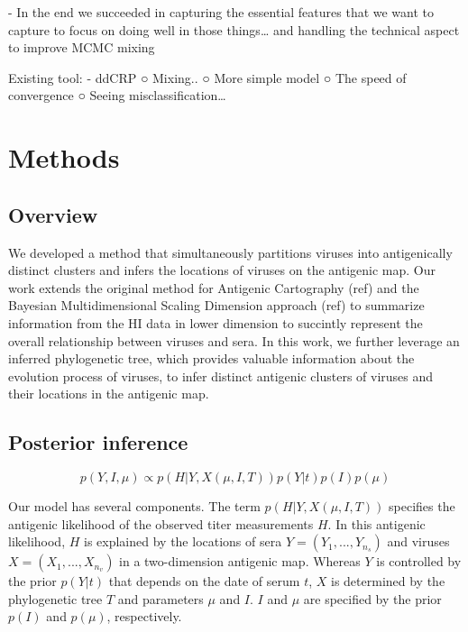 \documentclass[11pt,oneside,letterpaper]{article}
\begin{document}
	- In the end we succeeded in capturing the essential features that we want to capture to focus on doing well in those things… and handling the technical aspect to improve MCMC mixing

Existing tool:
	- ddCRP
		○ Mixing..
		○ More simple model
		○ The speed of convergence
		○ Seeing misclassification…



\newpage

\section*{Methods}

\subsection*{Overview}

We developed a method that simultaneously partitions viruses into antigenically distinct clusters and infers the locations of viruses on the antigenic map. 
Our work extends the original method for Antigenic Cartography (ref) and the Bayesian Multidimensional Scaling Dimension approach (ref) to summarize information from the HI data in lower dimension to succintly represent the overall relationship between viruses and sera.
In this work, we further leverage an inferred phylogenetic tree, which provides valuable information about the evolution process of viruses, to infer distinct antigenic clusters of viruses and their locations in the antigenic map.


\subsection*{Posterior inference}


\begin{equation}
  p(Y, I, \mu ) \propto  p(H|Y, X(\mu, I, T) ) p(Y| t ) p(I) p(\mu)
\end{equation}

Our model has several components.
The term $p(H|Y, X(\mu, I, T) )$ specifies the antigenic likelihood of the observed titer measurements $H$.
In this antigenic likelihood, $H$ is explained by the locations of sera $Y = (Y_1, ..., Y_{n_{s}} )$ and viruses $X=(X_1, ..., X_{n_v} )$ in a two-dimension antigenic map.
Whereas $Y$ is controlled by the prior $p(Y|t)$ that depends on the date of serum $t$,
 $X$ is determined by the phylogenetic tree $T$ and parameters $\mu$ and $I$.
$I$ and $\mu$ are specified by the prior $p(I)$ and $p(\mu)$, respectively.
\end{document}
